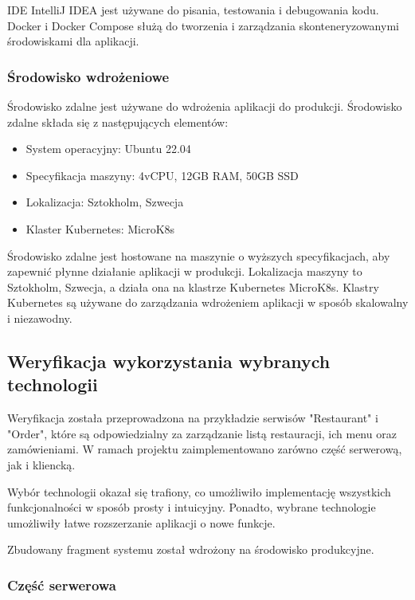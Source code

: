 IDE IntelliJ IDEA jest używane do pisania, testowania i debugowania kodu. Docker i Docker Compose służą do tworzenia i zarządzania skonteneryzowanymi środowiskami dla aplikacji.

\subsubsection{Środowisko wdrożeniowe}

Środowisko zdalne jest używane do wdrożenia aplikacji do produkcji. Środowisko zdalne składa się z następujących elementów:

\begin{itemize}
    \item System operacyjny: Ubuntu 22.04
    \item Specyfikacja maszyny: 4vCPU, 12GB RAM, 50GB SSD
    \item Lokalizacja: Sztokholm, Szwecja
    \item Klaster Kubernetes: MicroK8s
\end{itemize}

Środowisko zdalne jest hostowane na maszynie o wyższych specyfikacjach, aby zapewnić płynne działanie aplikacji w produkcji. Lokalizacja maszyny to Sztokholm, Szwecja, a działa ona na klastrze Kubernetes MicroK8s. Klastry Kubernetes są używane do zarządzania wdrożeniem aplikacji w sposób skalowalny i niezawodny.

\subsection{Weryfikacja wykorzystania wybranych technologii}

Weryfikacja została przeprowadzona na przykładzie serwisów "Restaurant" i "Order", które są odpowiedzialny za zarządzanie listą restauracji, ich menu oraz zamówieniami. W ramach projektu zaimplementowano zarówno część serwerową, jak i kliencką.

Wybór technologii okazał się trafiony, co umożliwiło implementację wszystkich funkcjonalności w sposób prosty i intuicyjny. Ponadto, wybrane technologie umożliwiły łatwe rozszerzanie aplikacji o nowe funkcje.

Zbudowany fragment systemu został wdrożony na środowisko produkcyjne.

\subsubsection{Część serwerowa}

